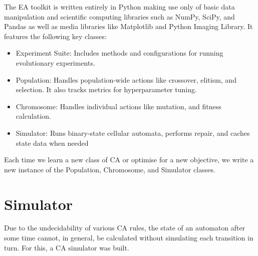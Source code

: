The EA toolkit is written entirely in Python making use only of basic data manipulation and scientific computing libraries such as NumPy, SciPy, and Pandas as well as media libraries like Matplotlib and Python Imaging Library. It features the following key classes:
\begin{itemize}
    \item Experiment Suite: Includes methods and configurations for running evolutionary experiments.
    \item Population: Handles population-wide actions like crossover, elitism, and selection. It also tracks metrics for hyperparameter tuning.
    \item Chromosome: Handles individual actions like mutation, and fitness calculation.
    \item Simulator: Runs binary-state cellular automata, performs repair, and caches state data when needed
\end{itemize}
Each time we learn a new class of CA or optimise for a new objective, we write a new instance of the Population,  Chromosome, and Simulator classes.

\section{Simulator} \label{subsec:simulator-1}
Due to the undecidability of various CA rules, the state of an automaton after some time cannot, in general, be calculated without simulating each transition in turn. For this, a CA simulator was built.\\

